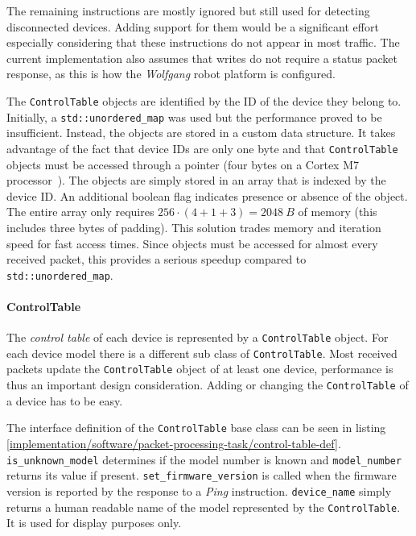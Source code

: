 The remaining instructions are mostly ignored but still used for detecting disconnected devices.
Adding support for them would be a significant effort especially considering that these instructions
do not appear in most traffic. The current implementation also assumes that writes do not require a
status packet response, as this is how the \textit{Wolfgang} robot platform is configured.

The \lstinline{ControlTable} objects are identified by the ID of the device they belong to. Initially,
a \lstinline{std::unordered_map} was used but the performance proved to be insufficient. Instead, the
objects are stored in a custom data structure. It takes advantage of the fact that device IDs are
only one byte and that \lstinline{ControlTable} objects must be accessed through a pointer (four bytes
on a Cortex M7 processor~\cite{mcu-ref-manual}). The objects are simply stored in an array that is
indexed by the device ID. An additional boolean flag indicates presence or absence of the object. The
entire array only requires $256 \cdot (4 + 1 + 3) = \SI{2048}{B}$ of memory (this includes three bytes
of padding).
This solution trades memory and iteration speed for fast access times. Since objects must be accessed
for almost every received packet, this provides a serious speedup compared to \lstinline{std::unordered_map}.

\paragraph{ControlTable}

The \textit{control table} of each device is represented by a \lstinline{ControlTable} object. For
each device model there is a different sub class of \lstinline{ControlTable}. Most received packets
update the \lstinline{ControlTable} object of at least one device, performance is thus an important
design consideration. Adding or changing the \lstinline{ControlTable} of a device has to be easy.

The interface definition of the \lstinline{ControlTable} base class can be seen in listing
\ref{implementation/software/packet-processing-task/control-table-def}. \lstinline{is_unknown_model}
determines if the model number is known and \lstinline{model_number} returns its value if present.
\lstinline{set_firmware_version} is called when the firmware version is reported by the response
to a \textit{Ping} instruction. \lstinline{device_name} simply returns a human readable name of the
model represented by the \lstinline{ControlTable}. It is used for display purposes only.

